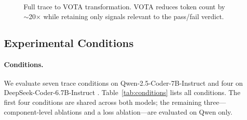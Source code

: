 \begin{figure}[t]
\centering
{}
\caption{Full trace to VOTA transformation. VOTA reduces token count by ${\sim}$20$\times$ while retaining only signals relevant to the pass/fail verdict.}
\label{fig:vota_example}
\end{figure}

\subsection{Experimental Conditions}
\label{sec:conditions}

\paragraph{Conditions.}
We evaluate seven trace conditions on Qwen-2.5-Coder-7B-Instruct \citep{placeholder_Qwen25Coder} and four on DeepSeek-Coder-6.7B-Instruct \citep{placeholder_DeepSeekCoder}.
Table~\ref{tab:conditions} lists all conditions.
The first four conditions are shared across both models; the remaining three---component-level ablations and a loss ablation---are evaluated on Qwen only.

